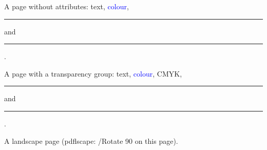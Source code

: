 \documentclass{article}
\begin{document}
\noindent A page without attributes: text, \textcolor{blue}{colour},
\rule{3cm}{0.3pt} and \rule{3cm}{4pt}.
\newpage

\noindent A page with a transparency group: text, \textcolor{blue}{colour},
\textcolor[cmyk]{0,0.5,1,0}{CMYK}, \rule{3cm}{0.3pt} and \rule{3cm}{4pt}.
\newpage
\pdfpageattr{}

\begin{landscape}
\noindent A landscape page (pdflscape: /Rotate 90 on this page).
\end{landscape}
\end{document}
